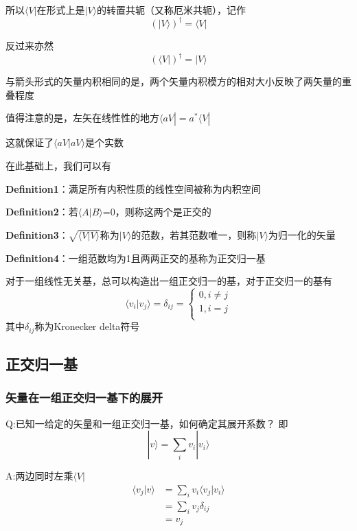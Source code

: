 \documentclass[lang=cn,10pt]{elegantbook}
\begin{document}
所以$\langle V|$在形式上是$|V\rangle$的转置共轭（又称厄米共轭），记作
\begin{equation}
	\left( |V\rangle \right) ^{\dagger}=\langle V|
\end{equation}

反过来亦然
\begin{equation}
	\left( \langle V| \right) ^{\dagger}=|V\rangle 
\end{equation}

与箭头形式的矢量内积相同的是，两个矢量内积模方的相对大小反映了两矢量的重叠程度

值得注意的是，左矢在线性性的地方$\langle aV|=a^*\langle  V|$

这就保证了$\langle aV|aV\rangle $是个实数

在此基础上，我们可以有

\textbf{Definition1}：满足所有内积性质的线性空间被称为内积空间

\textbf{Definition2}：若$\langle A|B\rangle $=0，则称这两个是正交的

\textbf{Definition3}：$\sqrt{\langle V|V\rangle }$称为$|V\rangle$的范数，若其范数唯一，则称$|V\rangle$为归一化的矢量

\textbf{Definition4}：一组范数均为1且两两正交的基称为正交归一基

对于一组线性无关基，总可以构造出一组正交归一的基，对于正交归一的基有
\begin{equation}
	\langle v_i|v_j\rangle =\delta _{ij}=\begin{cases}
		0,i\ne j\\
		1,i=j\\
	\end{cases}
\end{equation}
其中$\delta _{ij}$称为Kronecker delta符号

\subsection{正交归一基}
\subsubsection{矢量在一组正交归一基下的展开}
Q:已知一给定的矢量和一组正交归一基，如何确定其展开系数？
即\begin{equation*}
	|v\rangle=\sum_{i}v_i|v_i\rangle
\end{equation*}

A:两边同时左乘$\langle V|$
\begin{equation*}
	\begin{split}
		\langle v_j|v\rangle&=\sum_{i}v_i\langle v_j|v_i\rangle\\
		&=\sum_{i}v_j\delta_{ij}\\
		&=v_j
	\end{split}
\end{equation*}
\end{document}
